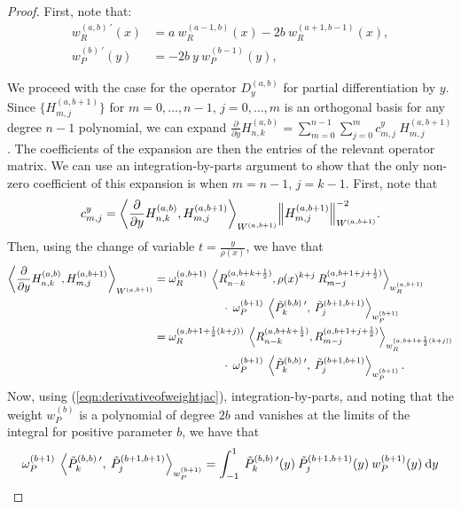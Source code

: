 \documentclass[11pt, oneside]{article}   	%
\newcommand{\half}{\frac{1}{2}}
\newcommand{\pddy}{\frac{\partial}{\partial y}}
\newcommand{\hdop}{H}
\newcommand{\hdopnkab}{\hdop_{n,k}^{(a,b)}}
\newcommand{\jac}{{\tilde P}}
\newcommand{\genjac}{R}
\newcommand{\genjacnmk}{\genjac_{n-k}}
\newcommand{\genjacmmj}{\genjac_{m-j}}
\newcommand{\genjacw}{w_\genjac}
\newcommand{\jacw}{w_P}
\newcommand{\normgenjac}{\omega_\genjac}
\newcommand{\normjac}{\omega_P}
\begin{document}
\begin{proof}
First, note that:
\begin{align}
	\genjacw^{(a,b) \: \prime}(x) &= a \: \genjacw^{(a-1,b)}(x) - 2b \: \genjacw^{(a+1,b-1)}(x), \label{eqn:derivativeofweightgenjac} \\
	\jacw^{(b) \: \prime}(y) &= - 2b \: y \: \jacw^{(b-1)}(y), \label{eqn:derivativeofweightjac}
\end{align}

We proceed with the case for the operator $D_y^{(a,b)}$ for partial differentiation by $y$. Since $\{\hdop^{(a, b+1)}_{m,j}\}$ for $m = 0,\dots,n-1$, $j = 0,\dots,m$ is an orthogonal basis for any degree $n-1$ polynomial, we can expand $\pddy \hdopnkab = \sum_{m=0}^{n-1} \sum_{j=0}^m c_{m,j}^y \: \hdop^{(a, b+1)}_{m,j}$. The coefficients of the expansion are then the entries of the relevant operator matrix. We can use an integration-by-parts argument to show that the only non-zero coefficient of this expansion is when $m = n-1$, $j = k-1$. First, note that
\begin{align*}
	c_{m,j}^y = {\ip<\pddy \hdopnkab, \hdop^{(a, b+1)}_{m,j} >_{W^{(a, b+1)}}}{\norm{\hdop^{(a, b+1)}_{m,j}}^{-2}_{W^{(a, b+1)}}}.
\end{align*}
Then, using the change of variable $t = \frac{y}{\rho(x)}$, we have that
\begin{align*}
	\ip<\pddy \hdopnkab, \hdop^{(a, b+1)}_{m,j} >_{W^{(a, b+1)}} &= \normgenjac^{(a, b+1)} \: \ip< \genjacnmk^{(a,b+k+\half)}, \rho(x)^{k+j} \: \genjacmmj^{(a,b+1+j+\half)} >_{\genjacw^{(a,b+1)}} \\
	&\quad \quad \quad \quad \quad \quad \cdot \: \normjac^{(b+1)} \: \ip< \jac_k^{(b,b) \: \prime}, \: \jac_{j}^{(b+1,b+1)} >_{\jacw^{(b+1)}} \\
	&= \normgenjac^{(a, b+1+\half(k+j))} \: \ip< \genjacnmk^{(a,b+k+\half)}, \genjacmmj^{(a,b+1+j+\half)} >_{\genjacw^{(a,b+1+\half(k+j))}} \\
		&\quad \quad \quad \quad \quad \quad \cdot \: \normjac^{(b+1)} \: \ip< \jac_k^{(b,b) \: \prime}, \: \jac_{j}^{(b+1,b+1)} >_{\jacw^{(b+1)}}.
\end{align*}
Now, using (\ref{eqn:derivativeofweightjac}), integration-by-parts, and noting that the weight $\jacw^{(b)}$ is a polynomial of degree $2b$ and vanishes at the limits of the integral for positive parameter $b$, we have that
\begin{align*}
	\normjac^{(b+1)} \: \ip< \jac_k^{(b,b) \: \prime}, \: \jac_{j}^{(b+1,b+1)} >_{\jacw^{(b+1)}} &= \int_{-1}^1 \: \jac_k^{(b,b) \: \prime}(y) \: \jac_{j}^{(b+1,b+1)}(y) \: \jacw^{(b+1)}(y) \: \D y \\

\end{align*}
\end{proof}
\end{document}
